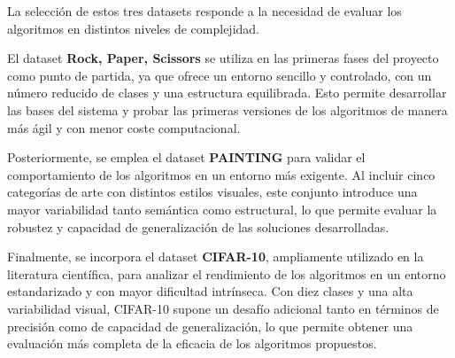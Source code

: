 \begin{table}[htp]
    \centering
    \caption{Resumen comparativo de los datasets utilizados}
    \label{tab:resumen-datasets}
\end{table}

La selección de estos tres datasets responde a la necesidad de evaluar los algoritmos en distintos niveles de complejidad.

El dataset \textbf{Rock, Paper, Scissors} se utiliza en las primeras fases del proyecto como punto de partida,
ya que ofrece un entorno sencillo y controlado, con un número reducido de clases y una estructura equilibrada.
Esto permite desarrollar las bases del sistema y probar las primeras versiones de los algoritmos de manera más ágil y con menor coste computacional.

Posteriormente, se emplea el dataset \textbf{PAINTING} para validar el comportamiento de los algoritmos en un entorno más exigente.
Al incluir cinco categorías de arte con distintos estilos visuales, este conjunto introduce una mayor variabilidad tanto semántica como estructural,
lo que permite evaluar la robustez y capacidad de generalización de las soluciones desarrolladas.

Finalmente, se incorpora el dataset \textbf{CIFAR-10}, ampliamente utilizado en la literatura científica, para analizar el rendimiento de los algoritmos
en un entorno estandarizado y con mayor dificultad intrínseca.
Con diez clases y una alta variabilidad visual, CIFAR-10 supone un desafío adicional tanto en términos de precisión como de capacidad de generalización,
lo que permite obtener una evaluación más completa de la eficacia de los algoritmos propuestos.


